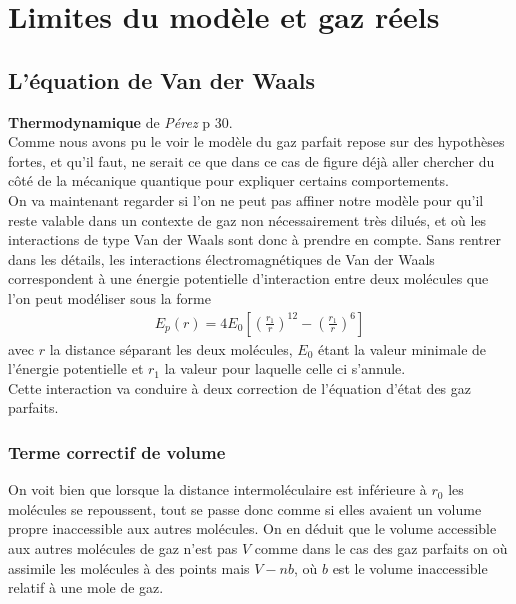 \documentclass[12pt,prb,aps,epsf]{article}
\begin{document}
\section{Limites du modèle et gaz réels}	
\subsection{L'équation de Van der Waals}
\textbf{Thermodynamique} de \textit{Pérez} p 30.\\

Comme nous avons pu le voir le modèle du gaz parfait repose sur des hypothèses fortes, et qu'il faut, ne serait ce que dans ce cas de figure déjà aller chercher du côté de la mécanique quantique pour expliquer certains comportements.\\

On va maintenant regarder si l'on ne peut pas affiner notre modèle pour qu'il reste valable dans un contexte de gaz non nécessairement très dilués, et où les interactions de type Van der Waals sont donc à prendre en compte. Sans rentrer dans les détails, les interactions électromagnétiques de Van der Waals correspondent à une énergie potentielle d'interaction entre deux molécules que l'on peut modéliser sous la forme
\begin{eqnarray}
E_p(r) = 4E_0 \left[\left(\frac{r_1}{r}\right)^{12} - \left(\frac{r_1}{r}\right)^{6}\right]
\end{eqnarray}
avec $r$ la distance séparant les deux molécules, $E_0$ étant la valeur minimale de l'énergie potentielle et $r_1$ la valeur pour laquelle celle ci s'annule. \\

Cette interaction va conduire à deux correction de l'équation d'état des gaz parfaits.

\subsubsection{Terme correctif de volume}
On voit bien que lorsque la distance intermoléculaire est inférieure à $r_0$ les molécules se repoussent, tout se passe donc comme si elles avaient un volume propre inaccessible aux autres molécules. On en déduit que le volume accessible aux autres molécules de gaz n'est pas $V$ comme dans le cas des gaz parfaits on où assimile les molécules à des points mais $V-nb$, où $b$ est le volume inaccessible relatif à une mole de gaz.
\end{document}
